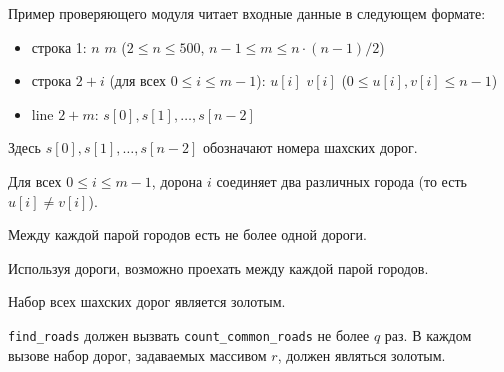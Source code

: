 Пример проверяющего модуля читает входные данные в следующем формате:
\begin{itemize}
\item строка 1: $n$ $m$ ($2 \leq n \leq 500$, $n - 1 \leq m \leq n \cdot (n - 1) / 2$)
\item строка $2 + i$ (для всех $0 \leq i \leq m - 1$): $u[i]$ $v[i]$ ($0 \leq u[i], v[i] \leq n - 1$)
\item line $2 + m$: $s[0], s[1], \ldots, s[n - 2]$
\end{itemize}

Здесь $s[0], s[1], \ldots, s[n - 2]$ обозначают номера шахских дорог.

Для всех $0 \leq i \leq m - 1$, дорона $i$ соединяет два различных города (то есть $u[i] \neq v[i]$).

Между каждой парой городов есть не более одной дороги.

Используя дороги, возможно проехать между каждой парой городов.

Набор всех шахских дорог является золотым.

\texttt{find\_roads} должен вызвать \texttt{count\_common\_roads} не более $q$ раз. В каждом вызове набор дорог, задаваемых массивом $r$, должен являться золотым.